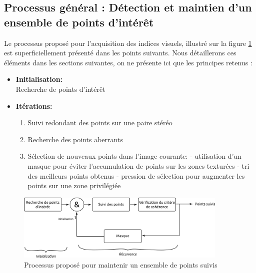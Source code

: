 \subsection{Processus général : Détection et maintien d'un ensemble de points d'intérêt}
Le processus proposé pour l'acquisition des indices visuels, illustré sur la figure \ref{fig:ch3_processus} est superficiellement présenté dans les points suivants. Nous détaillerons ces éléments dans les sections suivantes, on ne présente ici que les principes retenus : \\
\begin{itemize} \renewcommand{\labelitemii}{$\cdot$}
	\item \textbf{Initialisation:} \\ 
	Recherche de points d'intérêt	\\
	
	\item \textbf{Itérations:}
	\begin{enumerate}
		\item Suivi redondant des points sur une paire stéréo
		\item Recherche des points aberrants
		\item Sélection de nouveaux points dans l'image courante:
		\subitem - utilisation d'un masque pour éviter l'accumulation de points sur les zones texturées
		\subitem - tri des meilleurs points obtenus
		\subitem - pression de sélection pour augmenter les points sur une zone privilégiée
	\end{enumerate}
\end{itemize}

\begin{figure}[h]
	\centering
	\includegraphics[width=0.9\textwidth]{Chapter3/graphics/tracking_process.png}
	\caption{Processus proposé pour maintenir un ensemble de points suivis}
	\label{fig:ch3_processus}
\end{figure}

